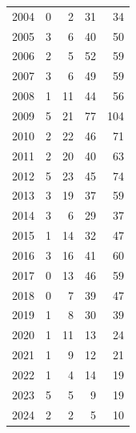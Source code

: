 \documentclass[
]{scrartcl}
\begin{document}
\begin{longtable}{rrrrr}
2004 & 0 & 2 & 31 & 34 \\ 
2005 & 3 & 6 & 40 & 50 \\ 
2006 & 2 & 5 & 52 & 59 \\ 
2007 & 3 & 6 & 49 & 59 \\ 
2008 & 1 & 11 & 44 & 56 \\ 
2009 & 5 & 21 & 77 & 104 \\ 
2010 & 2 & 22 & 46 & 71 \\ 
2011 & 2 & 20 & 40 & 63 \\ 
2012 & 5 & 23 & 45 & 74 \\ 
2013 & 3 & 19 & 37 & 59 \\ 
2014 & 3 & 6 & 29 & 37 \\ 
2015 & 1 & 14 & 32 & 47 \\ 
2016 & 3 & 16 & 41 & 60 \\ 
2017 & 0 & 13 & 46 & 59 \\ 
2018 & 0 & 7 & 39 & 47 \\ 
2019 & 1 & 8 & 30 & 39 \\ 
2020 & 1 & 11 & 13 & 24 \\ 
2021 & 1 & 9 & 12 & 21 \\ 
2022 & 1 & 4 & 14 & 19 \\ 
2023 & 5 & 5 & 9 & 19 \\ 
2024 & 2 & 2 & 5 & 10 \\ 
\bottomrule

\end{longtable}

\endgroup

\newpage{}

\begingroup
\fontsize{9.0pt}{10.8pt}\selectfont
\end{document}
